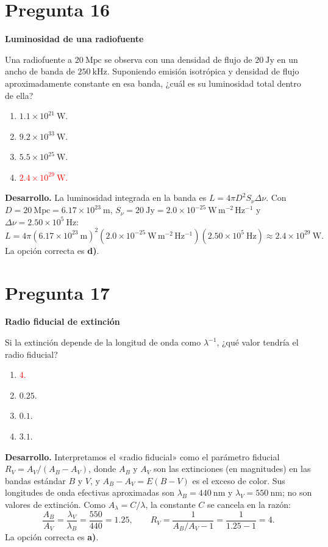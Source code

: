 \documentclass[a4paper,11pt]{article}
\newcommand{\pregunta}[2]{\section*{Pregunta #1}\textbf{#2}\par}
\begin{document}
\pregunta{16}{Luminosidad de una radiofuente}

Una radiofuente a $20\ \mathrm{Mpc}$ se observa con una densidad de flujo de $20\ \mathrm{Jy}$ en un ancho de banda de $250\ \mathrm{kHz}$. Suponiendo emisión isotrópica y densidad de flujo aproximadamente constante en esa banda, ¿cuál es su luminosidad total dentro de ella?

\begin{enumerate}
    \item $1.1\times10^{21}\ \mathrm{W}$.
    \item $9.2\times10^{33}\ \mathrm{W}$.
    \item $5.5\times10^{25}\ \mathrm{W}$.
    \item \textcolor{red}{$2.4\times10^{29}\ \mathrm{W}$.}
\end{enumerate}

\textbf{Desarrollo.} La luminosidad integrada en la banda es $L=4\pi D^2S_\nu\Delta\nu$. Con $D=20\ \mathrm{Mpc}=6.17\times10^{23}\ \mathrm{m}$, $S_\nu=20\ \mathrm{Jy}=2.0\times10^{-25}\ \mathrm{W\,m^{-2}\,Hz^{-1}}$ y $\Delta\nu=2.50\times10^5\ \mathrm{Hz}$:
\[
L=4\pi(6.17\times10^{23}\ \mathrm{m})^2(2.0\times10^{-25}\ \mathrm{W\,m^{-2}\,Hz^{-1}})(2.50\times10^5\ \mathrm{Hz})
\approx2.4\times10^{29}\ \mathrm{W}.
\]
La opción correcta es \textbf{d)}. \parencite[Sec. 10.3.1, pp. 327--328]{chaparro2026}

\pregunta{17}{Radio fiducial de extinción}

Si la extinción depende de la longitud de onda como $\lambda^{-1}$, ¿qué valor tendría el radio fiducial?

\begin{enumerate}
    \item \textcolor{red}{$4$.}
    \item $0.25$.
    \item $0.1$.
    \item $3.1$.
\end{enumerate}

\textbf{Desarrollo.} Interpretamos el «radio fiducial» como el parámetro fiducial $R_V=A_V/(A_B-A_V)$, donde $A_B$ y $A_V$ son las extinciones (en magnitudes) en las bandas estándar $B$ y $V$, y $A_B-A_V=E(B-V)$ es el exceso de color. Sus longitudes de onda efectivas aproximadas son $\lambda_B=440\ \mathrm{nm}$ y $\lambda_V=550\ \mathrm{nm}$; no son valores de extinción. Como $A_\lambda=C/\lambda$, la constante $C$ se cancela en la razón:
\[
\frac{A_B}{A_V}=\frac{\lambda_V}{\lambda_B}=\frac{550}{440}=1.25,
\qquad
R_V=\frac{1}{A_B/A_V-1}=\frac{1}{1.25-1}=4.
\]
La opción correcta es \textbf{a)}. \parencite[Sec. 12.3.1, pp. 383--385]{chaparro2026}
\end{document}
